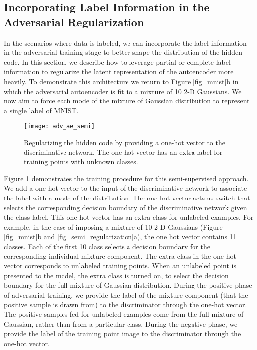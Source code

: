 \documentclass{article}
\begin{document}
\subsection{Incorporating Label Information in the Adversarial Regularization}\label{semi2}
In the scenarios where data is labeled, we can incorporate the label information in the adversarial training stage to better shape the distribution of the hidden code. 
In this section, we describe how to leverage partial or complete label information to regularize the latent representation of the autoencoder more heavily.
To demonstrate this architecture we return to Figure \ref{fig_mnist}b in which the adversarial autoencoder is fit to a mixture of 10 2-D Gaussians.
We now aim to force each mode of the mixture of Gaussian distribution to represent a single label of MNIST.

\begin{figure}[b]
\begin{center}
\centering 
\hspace{0.2cm}\texttt{[image: adv\_ae\_semi]}
\caption{\label{fig_semi_adv_b}Regularizing the hidden code by providing a one-hot vector to the discriminative network. The one-hot vector has an extra label for training points with unknown classes.}
\end{center}
\end{figure}

Figure \ref{fig_semi_adv_b} demonstrates the training procedure for this semi-supervised approach.
We add a one-hot vector to the input of the discriminative network to associate the label with a mode of the distribution. The one-hot vector acts as switch that selects the corresponding decision boundary of the discriminative network given the class label. This one-hot vector has an extra class for unlabeled examples.
For example, in the case of imposing a mixture of 10 2-D Gaussians (Figure \ref{fig_mnist}b and \ref{fig_semi_regularization}a), the one hot vector contains 11 classes. Each of the first 10 class selects a decision boundary for the corresponding individual mixture component. The extra class in the one-hot vector corresponds to unlabeled training points. When an unlabeled point is presented to the model, the extra class is turned on, to select the decision boundary for the full mixture of Gaussian distribution.
During the positive phase of adversarial training, we provide the label of the mixture component (that the positive sample is drawn from) to the discriminator through the one-hot vector.  The positive samples fed for unlabeled examples come from the full mixture of Gaussian, rather than from a particular class.
During the negative phase, we provide the label of the training point image to the discriminator through the one-hot vector.
\end{document}
